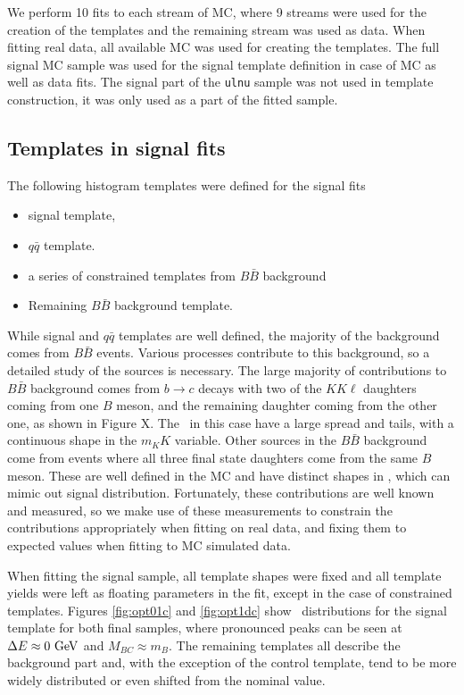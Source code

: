 We perform 10 fits to each stream of MC, where 9 streams were used for the creation of the templates and the remaining stream was used as data. When fitting real data, all available MC was used for creating the templates. The full signal MC sample was used for the signal template definition in case of MC as well as data fits. The signal part of the \texttt{ulnu} sample was not used in template construction, it was only used as a part of the fitted sample. 

\subsection{Templates in signal fits}
The following histogram templates were defined for the signal fits
\begin{itemize}
\item signal template,
\item $q \bar q$ template.
\item a series of constrained templates from $B \bar B$ background
\item Remaining $B \bar B$ background template.
\end{itemize}
While signal and $q \bar q$ templates are well defined, the majority of the background comes from $B \bar B$ events. Various processes contribute to this background, so a detailed study of the sources is necessary. The large majority of contributions to $B \bar B$ background comes from $b \to c$ decays with two of the $KK\ell$ daughters coming from one $B$ meson, and the remaining daughter coming from the other one, as shown in Figure X. The \vars~in this case have a large spread and tails, with a continuous shape in the $m_KK$ variable. Other sources in the $B \bar B$ background come from events where all three final state daughters come from the same $B$ meson. These are well defined in the MC and have distinct shapes in \vars, which can mimic out signal distribution. Fortunately, these contributions are well known and measured, so we make use of these measurements to constrain the contributions appropriately when fitting on real data, and fixing them to expected values when fitting to MC simulated data. 

When fitting the signal sample, all template shapes were fixed and all template yields were left as floating parameters in the fit, except in the case of constrained templates. Figures \ref{fig:opt01c} and \ref{fig:opt1dc} show \vars~distributions for the signal template for both final samples, where pronounced peaks can be seen at $\Delta E \approx 0\mathrm{~GeV}$ and $M_{BC} \approx m_B$. The remaining templates all describe the background part and, with the exception of the control template, tend to be more widely distributed or even shifted from the nominal value.


